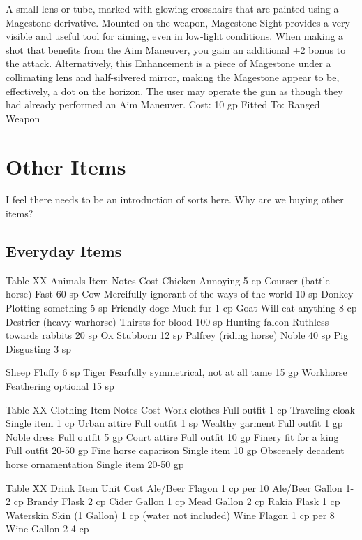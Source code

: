 \documentclass[oneside,11pt,english]{book}
\begin{document}
A small lens or tube, marked with glowing crosshairs that are painted using a Magestone derivative. 
Mounted on the weapon, Magestone Sight provides a very visible and useful tool for aiming, even in low-light conditions. When making a shot that benefits from the Aim Maneuver, you gain an additional +2 bonus to the attack. Alternatively, this Enhancement is a piece of Magestone under a collimating lens and half-silvered mirror, making the Magestone appear to be, effectively, a dot on the horizon. The user may operate the gun as though they had already performed an Aim Maneuver. 
Cost: 10 gp
Fitted To: Ranged Weapon 
 
\chapter{Other Items}\label{ch:Other Items} %
\startcontents[chapters]
\clearpage

I feel there needs to be an introduction of sorts here. Why are we buying other items?

\section{Everyday Items}
Table XX Animals 
Item Notes Cost 
Chicken Annoying 5 cp 
Courser (battle horse) Fast 60 sp 
Cow Mercifully ignorant of the ways of the world 10 sp 
Donkey Plotting something 5 sp 
Friendly doge Much fur 1 cp 
Goat Will eat anything 8 cp 
Destrier (heavy warhorse) Thirsts for blood 100 sp 
Hunting falcon Ruthless towards rabbits 20 sp 
Ox Stubborn 12 sp 
Palfrey (riding horse) Noble 40 sp 
Pig Disgusting 3 sp 


Sheep Fluffy 6 sp 
Tiger Fearfully symmetrical, not at all tame 15 gp 
Workhorse Feathering optional 15 sp 

 
Table XX Clothing 
Item Notes Cost 
Work clothes Full outfit 1 cp 
Traveling cloak Single item 1 cp 
Urban attire Full outfit 1 sp 
Wealthy garment Full outfit 1 gp 
Noble dress Full outfit 5 gp 
Court attire Full outfit 10 gp 
Finery fit for a king Full outfit 20-50 gp 
Fine horse caparison Single item 10 gp 
Obscenely decadent horse ornamentation Single item 20-50 gp 

 
Table XX Drink 
Item Unit Cost 
Ale/Beer Flagon 1 cp per 10 
Ale/Beer Gallon 1-2 cp 
Brandy Flask 2 cp 
Cider Gallon 1 cp 
Mead Gallon 2 cp 
Rakia Flask 1 cp 
Waterskin Skin (1 Gallon) 1 cp (water not included) 
Wine Flagon 1 cp per 8 
Wine Gallon 2-4 cp 
\end{document}
